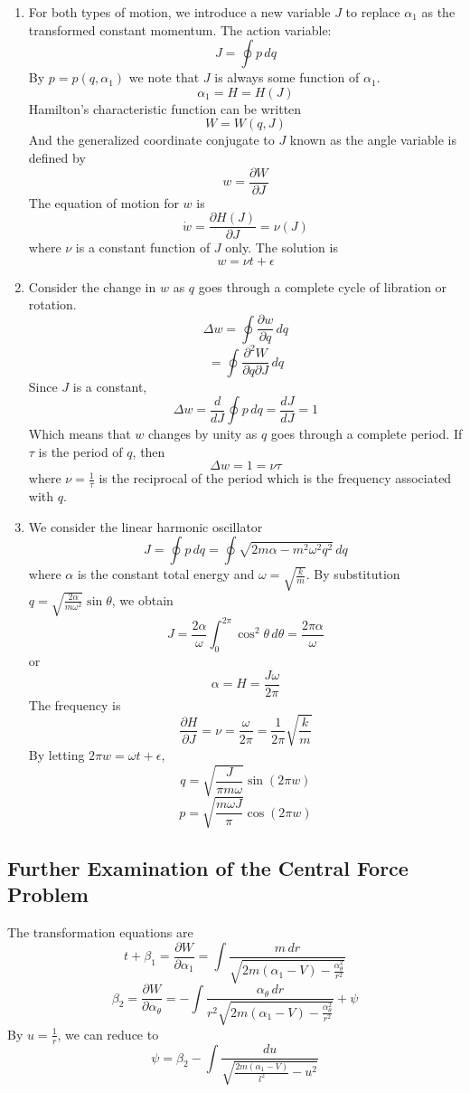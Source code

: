 \documentclass{article}
\begin{document}
\begin{enumerate}
		\item For both types of motion, we introduce a new variable $J$ to replace $\alpha_1$ as the transformed constant momentum.
		The action variable:
		\[ J = \oint p \, dq \]
		By $p=p(q, \alpha_1)$ we note that $J$ is always some function of $\alpha_1$.
		\[ \alpha_1 = H = H(J) \]
		Hamilton's characteristic function can be written
		\[ W = W(q, J) \]
		And the generalized coordinate conjugate to $J$ known as the angle variable is defined by
		\[ w = \frac{\partial W}{\partial J} \]
		The equation of motion for $w$ is
		\[ \dot{w} = \frac{\partial H(J)}{\partial J} = \nu(J) \]
		where $\nu$ is a constant function of $J$ only. The solution is
		\[ w = \nu t + \epsilon \]
		
		\item Consider the change in $w$ as $q$ goes through a complete cycle of libration or rotation.
		\[ \Delta w = \oint \frac{\partial w}{\partial q} \, dq \]
		\[ = \oint \frac{\partial^2 W}{\partial q \partial J} \, dq \]
		Since $J$ is a constant,
		\[ \Delta w = \frac{d}{dJ} \oint p \, dq = \frac{dJ}{dJ} = 1 \]
		Which means that $w$ changes by unity as $q$ goes through a complete period. If $\tau$ is the period of $q$, then
		\[ \Delta w = 1 = \nu\tau \]
		where $\nu = \frac{1}{\tau}$ is the reciprocal of the period which is the frequency associated with $q$.
		
		\item We consider the linear harmonic oscillator
		\[ J = \oint p \, dq = \oint \sqrt{2m\alpha - m^2\omega^2 q^2} \, dq \]
		where $\alpha$ is the constant total energy and $\omega = \sqrt{\frac{k}{m}}$. By substitution $q = \sqrt{\frac{2\alpha}{m\omega^2}} \sin\theta$,
		we obtain
		\[ J = \frac{2\alpha}{\omega} \int_0^{2\pi} \cos^2\theta \, d\theta = \frac{2\pi\alpha}{\omega} \]
		or
		\[ \alpha = H = \frac{J\omega}{2\pi} \]
		The frequency is
		\[ \frac{\partial H}{\partial J} = \nu = \frac{\omega}{2\pi} = \frac{1}{2\pi}\sqrt{\frac{k}{m}} \]
		By letting $2\pi w = \omega t + \epsilon$,
		\[ q = \sqrt{\frac{J}{\pi m\omega}} \sin(2\pi w) \]
		\[ p = \sqrt{\frac{m\omega J}{\pi}} \cos(2\pi w) \]
	\end{enumerate}
	
	\subsection*{Further Examination of the Central Force Problem}
	The transformation equations are
	\[ t + \beta_1 = \frac{\partial W}{\partial \alpha_1} = \int \frac{m \, dr}{\sqrt{2m(\alpha_1-V) - \frac{\alpha_\theta^2}{r^2}}} \]
	\[ \beta_2 = \frac{\partial W}{\partial \alpha_\theta} = -\int \frac{\alpha_\theta \, dr}{r^2 \sqrt{2m(\alpha_1-V) - \frac{\alpha_\theta^2}{r^2}}} + \psi \]
	By $u=\frac{1}{r}$, we can reduce to
	\[ \psi = \beta_2 - \int \frac{du}{\sqrt{\frac{2m(\alpha_1-V)}{l^2} - u^2}} \]
	
\end{document}

